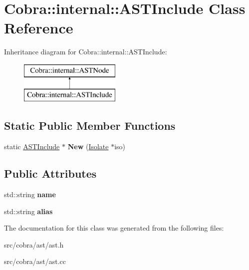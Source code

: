 \hypertarget{class_cobra_1_1internal_1_1_a_s_t_include}{\section{Cobra\+:\+:internal\+:\+:A\+S\+T\+Include Class Reference}
\label{class_cobra_1_1internal_1_1_a_s_t_include}
}
Inheritance diagram for Cobra\+:\+:internal\+:\+:A\+S\+T\+Include\+:\begin{figure}[H]
\begin{center}
\leavevmode
\includegraphics[height=2.000000cm]{class_cobra_1_1internal_1_1_a_s_t_include}
\end{center}
\end{figure}
\subsection*{Static Public Member Functions}
\begin{DoxyCompactItemize}
\item 
\hypertarget{class_cobra_1_1internal_1_1_a_s_t_include_a6c31b6a9885e40a7027515489b02e8e1}{static \hyperlink{class_cobra_1_1internal_1_1_a_s_t_include}{A\+S\+T\+Include} $\ast$ {\bfseries New} (\hyperlink{class_cobra_1_1internal_1_1_isolate}{Isolate} $\ast$iso)}\label{class_cobra_1_1internal_1_1_a_s_t_include_a6c31b6a9885e40a7027515489b02e8e1}

\end{DoxyCompactItemize}
\subsection*{Public Attributes}
\begin{DoxyCompactItemize}
\item 
\hypertarget{class_cobra_1_1internal_1_1_a_s_t_include_adebc903664510cde12c21e263a3b5df7}{std\+::string {\bfseries name}}\label{class_cobra_1_1internal_1_1_a_s_t_include_adebc903664510cde12c21e263a3b5df7}

\item 
\hypertarget{class_cobra_1_1internal_1_1_a_s_t_include_a194048f23414ee955145161fad552e21}{std\+::string {\bfseries alias}}\label{class_cobra_1_1internal_1_1_a_s_t_include_a194048f23414ee955145161fad552e21}

\end{DoxyCompactItemize}


The documentation for this class was generated from the following files\+:\begin{DoxyCompactItemize}
\item 
src/cobra/ast/ast.\+h\item 
src/cobra/ast/ast.\+cc\end{DoxyCompactItemize}
